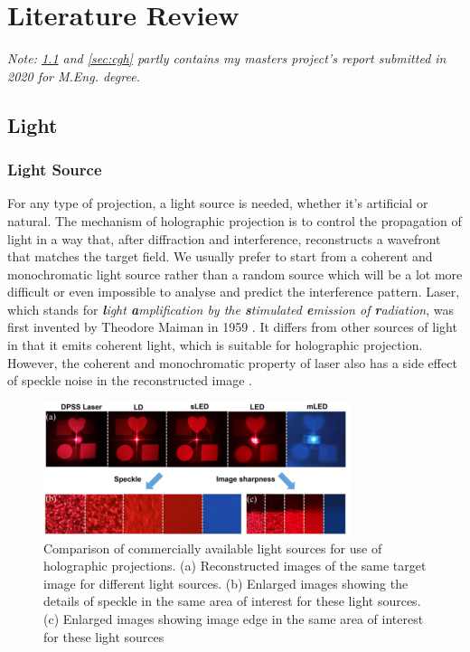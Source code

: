 \chapter{Literature Review} \label{sec:Literature Review}

\graphicspath{{Chapter2/Figs/}}


\textit{Note: \cref{sec:light} and \cref{sec:cgh} partly contains my masters project's report submitted in 2020 for M.Eng. degree.}


\section{Light} \label{sec:light}
\subsection{Light Source}
For any type of projection, a light source is needed, whether it's artificial or natural. The mechanism of holographic projection is to control the propagation of light in a way that, after diffraction and interference, reconstructs a wavefront that matches the target field. We usually prefer to start from a coherent and monochromatic light source rather than a random source which will be a lot more difficult or even impossible to analyse and predict the interference pattern. Laser, which stands for \textit{\textbf{l}ight \textbf{a}mplification by the \textbf{s}timulated \textbf{e}mission of \textbf{r}adiation}, was first invented by Theodore Maiman in 1959 \cite{Gordon1959, Cartlidge2007}. It differs from other sources of light in that it emits coherent light, which is suitable for holographic projection. However, the coherent and monochromatic property of laser also has a side effect of speckle noise in the reconstructed image \cite{John1966}.

\begin{figure}[H]
  \centering
  \includegraphics[width=0.8\textwidth]{light-source-comparison.png}
  \caption{Comparison of commercially available light sources for use of holographic projections. (a) Reconstructed images of the same target image for different light sources. (b) Enlarged images showing the details of speckle in the same area of interest for these light sources. (c) Enlarged images showing image edge in the same area of interest for these light sources \cite{Deng2017}}\label{fig:light-source-comparison}
\end{figure}

